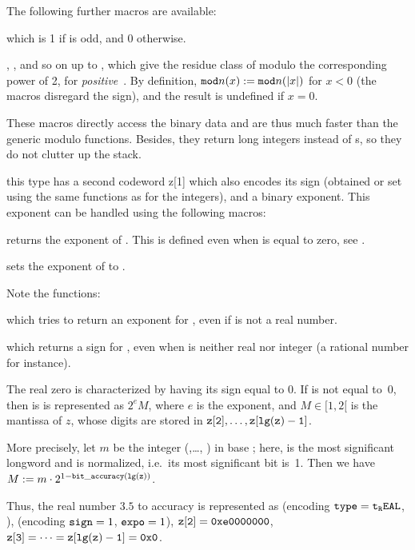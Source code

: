 \noindent The following further macros are available:

 which is 1 if  is odd, and 0 otherwise.

, , and so on up to ,
which give the residue class of  modulo the corresponding power of
2, for \emph{positive}~. By definition, ${\tt mod}n(x) :=
{\tt mod}n(|x|)$ for $x < 0$ (the macros disregard the sign), and the
result is undefined if $x = 0$.

These macros directly access the binary data and are thus much faster than
the generic modulo functions. Besides, they return long integers instead of
s, so they do not clutter up the stack.

this type has a second codeword z[1] which also encodes its sign (obtained
or set using the same functions as for the integers), and a binary
exponent. This exponent can be handled using the following macros:

 returns the exponent of .
This is defined even when  is equal to zero, see
.

 sets the exponent of  to .

\noindent Note the functions:

 which tries to return an exponent for ,
even if  is not a real number.

 which returns a sign for , even when
 is neither real nor integer (a rational number for instance).

The real zero is characterized by having its sign equal to 0. If  is
not equal to~0, then is is represented as $2^e M$, where $e$ is the exponent,
and $M\in [1, 2[$ is the mantissa of $z$, whose digits are stored in
${\tt z[2]},\dots, {\tt z[lg(z)-1]}$.

More precisely, let $m$ be the integer (,\dots, )
in base ; here,  is the most significant
longword and is normalized, i.e.~its most significant bit is~1. Then we have
$M := m \cdot 2^{1 - {\tt bit\_accuracy(lg(z))}}$.

Thus, the real number $3.5$ to accuracy  is
represented as  (encoding ${\tt type} = {\tt t_REAL}$, ),
 (encoding ${\tt sign} = 1$, ${\tt expo} = 1$), ${\tt z[2]} =
{\tt 0xe0000000}$, ${\tt z[3]} =\dots = {\tt z[lg(z)-1]} = {\tt 0x0}$.

